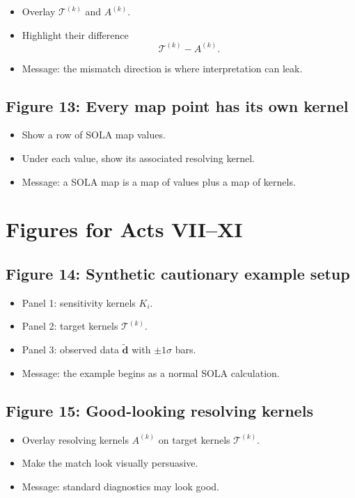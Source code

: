 \documentclass[11pt,openany]{book}
\theoremstyle{definition}
\theoremstyle{remark}
\begin{document}
\begin{itemize}[leftmargin=*]
  \item Overlay \(\mathcal T^{(k)}\) and \(A^{(k)}\).
  \item Highlight their difference
  \[
    \mathcal T^{(k)}-A^{(k)}.
  \]
  \item Message: the mismatch direction is where interpretation can leak.
\end{itemize}

\subsection*{Figure 13: Every map point has its own kernel}

\begin{itemize}[leftmargin=*]
  \item Show a row of SOLA map values.
  \item Under each value, show its associated resolving kernel.
  \item Message: a SOLA map is a map of values plus a map of kernels.
\end{itemize}

\section{Figures for Acts VII--XI}

\subsection*{Figure 14: Synthetic cautionary example setup}

\begin{itemize}[leftmargin=*]
  \item Panel 1: sensitivity kernels \(K_i\).
  \item Panel 2: target kernels \(\mathcal T^{(k)}\).
  \item Panel 3: observed data \(\widetilde{\mathbf d}\) with \(\pm1\sigma\) bars.
  \item Message: the example begins as a normal SOLA calculation.
\end{itemize}

\subsection*{Figure 15: Good-looking resolving kernels}

\begin{itemize}[leftmargin=*]
  \item Overlay resolving kernels \(A^{(k)}\) on target kernels \(\mathcal T^{(k)}\).
  \item Make the match look visually persuasive.
  \item Message: standard diagnostics may look good.
\end{itemize}
\end{document}
